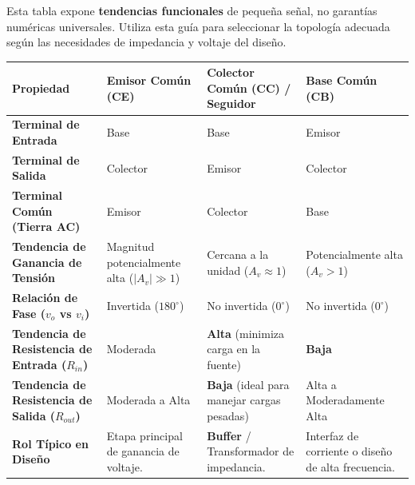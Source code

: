 \documentclass[11pt, a4paper]{article}
\begin{document}
\begin{tcolorbox}[colback=ucbblue!5, colframe=ucbblue, title=\textbf{Comparación Funcional de Configuraciones del BJT}]
    Esta tabla expone \textbf{tendencias funcionales} de pequeña señal, no garantías numéricas universales. Utiliza esta guía para seleccionar la topología adecuada según las necesidades de impedancia y voltaje del diseño.
\end{tcolorbox}

\vspace{0.5cm}

\renewcommand{\arraystretch}{1.8}
\begin{tabularx}{\textwidth}{|>{\raggedright\arraybackslash}p{3.8cm}|>{\raggedright\arraybackslash}X|>{\raggedright\arraybackslash}X|>{\raggedright\arraybackslash}X|}
\hline
\rowcolor{ucbblue!20}
\textbf{Propiedad} & \textbf{Emisor Común (CE)} & \textbf{Colector Común (CC) / Seguidor} & \textbf{Base Común (CB)} \\ \hline
\textbf{Terminal de Entrada} & Base & Base & Emisor \\ \hline
\textbf{Terminal de Salida} & Colector & Emisor & Colector \\ \hline
\textbf{Terminal Común (Tierra AC)} & Emisor & Colector & Base \\ \hline
\textbf{Tendencia de Ganancia de Tensión} & Magnitud potencialmente alta ($|A_v| \gg 1$) & Cercana a la unidad ($A_v \approx 1$) & Potencialmente alta ($A_v > 1$) \\ \hline
\textbf{Relación de Fase ($v_o$ vs $v_i$)} & Invertida ($180^\circ$) & No invertida ($0^\circ$) & No invertida ($0^\circ$) \\ \hline
\textbf{Tendencia de Resistencia de Entrada ($R_{in}$)} & Moderada & \textbf{Alta} (minimiza carga en la fuente) & \textbf{Baja} \\ \hline
\textbf{Tendencia de Resistencia de Salida ($R_{out}$)} & Moderada a Alta & \textbf{Baja} (ideal para manejar cargas pesadas) & Alta a Moderadamente Alta \\ \hline
\textbf{Rol Típico en Diseño} & Etapa principal de ganancia de voltaje. & \textbf{Buffer} / Transformador de impedancia. & Interfaz de corriente o diseño de alta frecuencia. \\ \hline
\end{tabularx}

\vspace{1cm}
\end{document}

